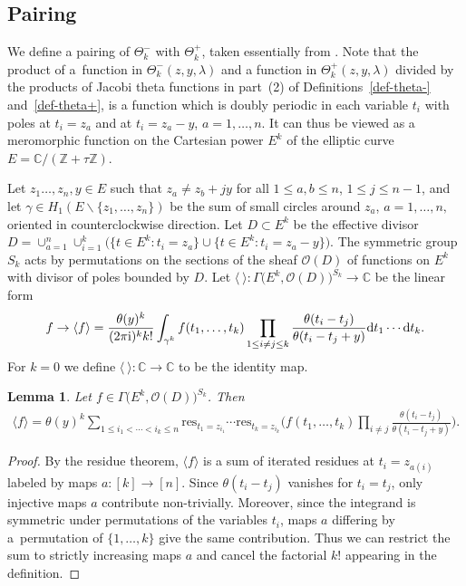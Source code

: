 \documentclass[10pt,a4paper]{amsart}
\numberwithin{equation}{section}
\newtheorem{Lemma}[Theorem]{Lemma}
\begin{document}
\subsection{Pairing}
We define a pairing of $\Theta^-_k$ with $\Theta^+_k$, taken essentially from \cite[Appendix~C]{TV2}. Note that the product of a~function in $\Theta^-_k(z,y,\lambda)$ and a function in $\Theta^+_k(z,y,\lambda)$ divided by the products of Jacobi theta functions in part~(2) of Definitions~\ref{def-theta-} and~\ref{def-theta+}, is a function which is doubly periodic in each variable $t_i$ with poles at $t_i=z_a$ and at $t_i=z_a-y$, $a=1,\dots,n$. It can thus be viewed as a meromorphic function on the Cartesian power $E^k$ of the elliptic curve $E=\mathbb C/(\mathbb Z+\tau\mathbb Z)$.
\begin{Definition} Let $z_1\dots,z_n,y\in E$ such that $z_a\neq z_b+jy$ for all $1\leq a,b\leq n$, $1\leq j\leq n-1$, and let $\gamma\in H_1(E\smallsetminus\{z_1,\dots,z_n\})$ be the sum of small circles around $z_a$, $a=1,\dots,n,$ oriented in counterclockwise direction. Let $D\subset E^k$ be the effective divisor $D=\cup_{a=1}^n\cup_{i=1}^k\big(\big\{t\in E^k\colon t_i=z_a\big\}\cup\big\{t\in E^k\colon t_i=z_a-y\big\}\big)$. The symmetric group $S_k$ acts by permutations on the sections of the sheaf $\mathcal O(D)$ of functions on $E^k$ with divisor of poles bounded by $D$. Let $\langle \ \rangle\colon\Gamma\big(E^k,\mathcal O(D)\big)^{S_k}\to \mathbb C$ be the linear form
 \begin{gather*}
 f\to\langle f\rangle= \frac{\theta(y)^k}{(2\pi{\rm i})^kk!} \int_{\gamma^k} f(t_1,\dots,t_k)\prod_{1\leq i\neq j\leq k} \frac{\theta(t_i-t_j)} {\theta(t_i-t_j+y)}{\rm d}t_1\cdots {\rm d}t_k.
 \end{gather*}
For $k=0$ we define $\langle \ \rangle\colon\mathbb C\to\mathbb C$ to be the identity map.
\end{Definition}
\begin{Lemma}\label{lemma-2} Let $f\in\Gamma\big(E^k,\mathcal O(D)\big)^{S_k}$. Then
 \begin{gather*}
 \langle f\rangle=\theta(y)^k\sum_{1\leq i_1<\cdots<i_k\leq n}\mathrm{res}_{t_1=z_{i_1}}\cdots\mathrm{res}_{t_k=z_{i_k}} \bigg(f(t_1,\dots,t_k)\prod_{i\neq j} \frac{\theta(t_i-t_j)} {\theta(t_i-t_j+y)}\bigg).
 \end{gather*}
\end{Lemma}
\begin{proof} By the residue theorem, $\langle f\rangle$ is a sum of iterated residues at $t_i=z_{a(i)}$ labeled by maps $a\colon [k]\to[n]$. Since $\theta(t_i-t_j)$ vanishes for $t_i=t_j$, only injective maps $a$ contribute non-trivially. Moreover, since the integrand is symmetric under permutations of the variables $t_i$, maps $a$ differing by a~permutation of $\{1,\dots,k\}$ give the same contribution. Thus we can restrict the sum to strictly increasing maps $a$ and cancel the factorial $k!$ appearing in the definition.
\end{proof}
\end{document}
